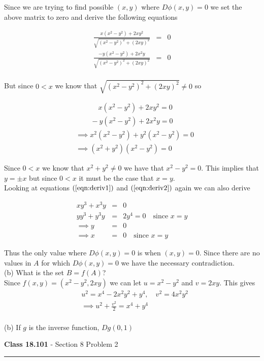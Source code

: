 \documentclass[11pt,reqno]{article}
\begin{document}
Since we are trying to find possible $(x,y)$ where $D \phi(x,y) = 0$ we set the above matrix to zero and derive the following equations

\begin{eqnarray*}
\frac{x(x^2 - y^2) + 2 x y^2}{\sqrt{(x^2 - y^2)^2 + (2 x y)^2}} &=& 0\\
\frac{-y(x^2 - y^2) + 2 x^2 y}{\sqrt{(x^2 - y^2)^2 + (2 x y)^2}} &=& 0\\
\end{eqnarray*}

\noindent But since $0 < x$ we know that $\sqrt{(x^2 - y^2)^2 + (2 x y)^2} \neq 0$ so 

\begin{align}
&\hspace{38pt}x(x^2 - y^2) + 2 x y^2 = 0 \label{eqn:deriv1}\\
&\hspace{25pt}-y(x^2 - y^2) + 2 x^2 y = 0 \label{eqn:deriv2}\\
&\implies x^2 (x^2 - y^2) + y^2 (x^2 - y^2 ) = 0 \nonumber \\
&\implies (x^2 + y^2) (x^2 - y^2) = 0 \nonumber
\end{align}

Since $0 < x$ we know that $x^2 + y^2 \neq 0$ we have that $x^2 - y^2 = 0$. This implies that $y = \pm x$ but since $0 < x$ it must be the case that $x = y$.\\
Looking at equations $(\ref{eqn:deriv1})$ and $(\ref{eqn:deriv2})$ again we can also derive

\begin{eqnarray*} 
x y^3 + x^3 y &=& 0 \\
y y^3 + y^3 y &=& 2 y^4 = 0 \quad \text{since $x = y$}\\
\implies y &=& 0\\
\implies x &=& 0 \quad \text{since $x = y$}
\end{eqnarray*}

Thus the only value where $D \phi(x,y) = 0$ is when $(x,y) = 0$. Since there are no values in $A$ for which $D \phi(x,y) = 0$ we have the necessary contradiction.\\

\noindent (b) What is the set $B = f(A)$?\\

Since $f(x,y) = (x^2 - y^2, 2 x y)$ we can let $u = x^2 - y^2$ and $v = 2 x y$. This gives
\begin{align*}
&u^2 = x^4 - 2 x^2 y^2 + y^4, \quad v^2 = 4 x^2 y^2 \\
&\implies u^2  + \frac{v^2}{2} = x^4 + y^4
\\\end{align*}

 

\noindent (b) If $g$ is the inverse function, $D g(0,1)$\\


\begin{flushleft} 
\textbf{Class 18.101} - Section 8 Problem 2\\
\rule{500pt}{1pt}\\
\end{flushleft} 
\end{document}
